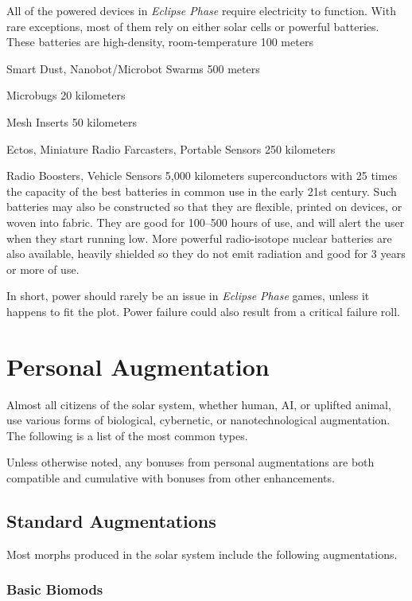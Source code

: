 All of the powered devices in \textit{Eclipse Phase} require 
electricity to function. With rare exceptions, most of 
them rely on either solar cells or powerful batteries. 
These batteries are high-density, room-temperature 
100 meters

Smart Dust, Nanobot/Microbot Swarms
500 meters

Microbugs
20 kilometers

Mesh Inserts
50 kilometers

Ectos, Miniature Radio Farcasters, Portable Sensors
250 kilometers

Radio Boosters, Vehicle Sensors
5,000 kilometers 
superconductors with 25 times the capacity of the 
best batteries in common use in the early 21st century. 
Such batteries may also be constructed so that they 
are flexible, printed on devices, or woven into fabric. 
They are good for 100–500 hours of use, and will alert 
the user when they start running low. More powerful
radio-isotope nuclear batteries are also available,
heavily shielded so they do not emit radiation and 
good for 3 years or more of use.

In short, power should rarely be an issue in \textit{Eclipse }
\textit{Phase} games, unless it happens to fit the plot. Power 
failure could also result from a critical failure roll.

\section{Personal Augmentation}

Almost all citizens of the solar system, whether human, 
AI, or uplifted animal, use various forms of biological, 
cybernetic, or nanotechnological augmentation. The 
following is a list of the most common types.

Unless otherwise noted, any bonuses from personal 
augmentations are both compatible and cumulative 
with bonuses from other enhancements.

\subsection{Standard Augmentations}

Most morphs produced in the solar system include the 
following augmentations.

\subsubsection{Basic Biomods}

